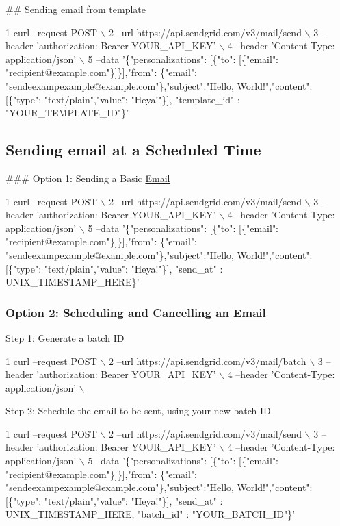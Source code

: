 \#\# Sending email from template 
\begin{DoxyCode}
1 curl --request POST \(\backslash\)
2   --url https://api.sendgrid.com/v3/mail/send \(\backslash\)
3   --header 'authorization: Bearer YOUR\_API\_KEY' \(\backslash\)
4   --header 'Content-Type: application/json' \(\backslash\)
5   --data '\{"personalizations": [\{"to": [\{"email": "recipient@example.com"\}]\}],"from": \{"email":
       "sendeexampexample@example.com"\},"subject":"Hello, World!","content": [\{"type": "text/plain","value": "Heya!"\}],
       "template\_id" : "YOUR\_TEMPLATE\_ID"\}'
\end{DoxyCode}
 \subsection*{Sending email at a Scheduled Time}

\#\#\# Option 1\+: Sending a Basic \hyperlink{class_email}{Email} 
\begin{DoxyCode}
1 curl --request POST \(\backslash\)
2   --url https://api.sendgrid.com/v3/mail/send \(\backslash\)
3   --header 'authorization: Bearer YOUR\_API\_KEY' \(\backslash\)
4   --header 'Content-Type: application/json' \(\backslash\)
5   --data '\{"personalizations": [\{"to": [\{"email": "recipient@example.com"\}]\}],"from": \{"email":
       "sendeexampexample@example.com"\},"subject":"Hello, World!","content": [\{"type": "text/plain","value": "Heya!"\}],
       "send\_at" : UNIX\_TIMESTAMP\_HERE\}'
\end{DoxyCode}


\subsubsection*{Option 2\+: Scheduling and Cancelling an \hyperlink{class_email}{Email}}

Step 1\+: Generate a batch I\+D 
\begin{DoxyCode}
1 curl --request POST \(\backslash\)
2   --url https://api.sendgrid.com/v3/mail/batch \(\backslash\)
3   --header 'authorization: Bearer YOUR\_API\_KEY' \(\backslash\)
4   --header 'Content-Type: application/json' \(\backslash\)
\end{DoxyCode}


Step 2\+: Schedule the email to be sent, using your new batch I\+D 
\begin{DoxyCode}
1 curl --request POST \(\backslash\)
2   --url https://api.sendgrid.com/v3/mail/send \(\backslash\)
3   --header 'authorization: Bearer YOUR\_API\_KEY' \(\backslash\)
4   --header 'Content-Type: application/json' \(\backslash\)
5   --data '\{"personalizations": [\{"to": [\{"email": "recipient@example.com"\}]\}],"from": \{"email":
       "sendeexampexample@example.com"\},"subject":"Hello, World!","content": [\{"type": "text/plain","value": "Heya!"\}],
       "send\_at" : UNIX\_TIMESTAMP\_HERE, "batch\_id" : "YOUR\_BATCH\_ID"\}'
\end{DoxyCode}


